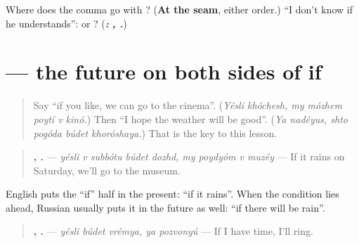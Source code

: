 \begin{tcolorbox}[breakable,colback=teal!4,colframe=teal!35!black,title={Before you move on}]
Where does the comma go with \emph{}? (\textbf{At the seam}, either order.) \textquotedblleft{}I don't know if he understands\textquotedblright{}: \emph{} or \emph{}? (\emph{\textbf{:}} \emph{\textbf{  ,   .}})
\end{tcolorbox}
\section[\texorpdfstring{\ru{если} \ru{будет} … (yésli búdet …)}{если будет … (yésli búdet …)}]{   — the future on both sides of if}

\label{lesson:RU-C269-yesli-budet}



\begin{quote}
Say \textquotedblleft{}if you like, we can go to the cinema\textquotedblright{}. (\emph{Yésli khóchesh, my mózhem poytí v kinó.}) Then \textquotedblleft{}I hope the weather will be good\textquotedblright{}. (\emph{Ya nadéyus, shto pogóda búdet khoróshaya.}) That \emph{} is the key to this lesson.
\end{quote}

\begin{grammarlens}[title={Grammar Lens: the future on both sides}]
\begin{quote}
\textbf{    ,    .} — \emph{yésli v subbótu búdet dozhd, my poydyóm v muzéy} — If it rains on Saturday, we'll go to the museum.
\end{quote}

English puts the \textquotedblleft{}if\textquotedblright{} half in the present: \textquotedblleft{}if it rains\textquotedblright{}. When the condition lies ahead, Russian usually puts it in the future as well: \textquotedblleft{}if there will be rain\textquotedblright{}.

\begin{quote}
\textbf{  ,  .} — \emph{yésli búdet vrémya, ya pozvonyú} — If I have time, I'll ring.
\end{quote}
\end{grammarlens}

